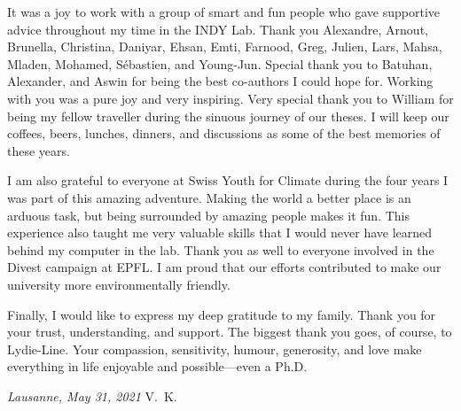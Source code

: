 It was a joy to work with a group of smart and fun people who gave supportive advice throughout my time in the INDY Lab.
Thank you
Alexandre,
Arnout,
Brunella,
Christina,
Daniyar,
Ehsan,
Emti,
Farnood,
Greg,
Julien,
Lars,
Mahsa,
Mladen,
Mohamed,
Sébastien,
and Young-Jun.
Special thank you to Batuhan, Alexander, and Aswin for being the best co-authors I could hope for.
Working with you was a pure joy and very inspiring.
Very special thank you to William for being my fellow traveller during the sinuous journey of our theses.
I will keep our coffees, beers, lunches, dinners, and discussions as some of the best memories of these years.

I am also grateful to everyone at Swiss Youth for Climate during the four years I was part of this amazing adventure.
Making the world a better place is an arduous task, but being surrounded by amazing people makes it fun.
This experience also taught me very valuable skills that I would never have learned behind my computer in the lab.
Thank you as well to everyone involved in the Divest campaign at EPFL.
I am proud that our efforts contributed to make our university more environmentally friendly.

Finally, I would like to express my deep gratitude to my family.
Thank you for your trust, understanding, and support.
The biggest thank you goes, of course, to Lydie-Line.
Your compassion, sensitivity, humour, generosity, and love make everything in life enjoyable and possible---even a Ph.D.

\bigskip

\noindent\textit{Lausanne, May 31, 2021}
\hfill V.~K.

